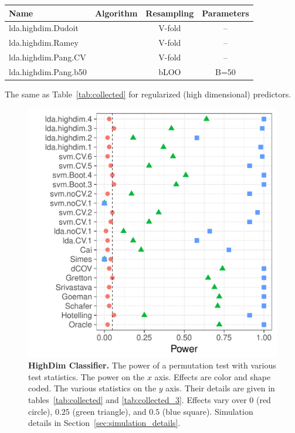 \documentclass[journal]{IEEEtran}
\begin{document}
\begin{tcolorbox}
	\centering
	\tiny
	\begin{tabular}{l|c|c|c}
		Name & Algorithm & Resampling &  Parameters\\ 
		\hline
		\hline
		lda.highdim.Dudoit & \cite{dudoit_comparison_2002} & V-fold & -- \\ 
		lda.highdim.Ramey & \cite{ramey_high-dimensional_2016} & V-fold & -- \\ 
		lda.highdim.Pang.CV & \cite{pang_shrinkage-based_2009} & V-fold & -- \\ 
		lda.highdim.Pang.b50 & \cite{pang_shrinkage-based_2009} & bLOO 	 & B=50 \\ 
	\end{tabular} 
	\captionsetup{type=table}
	\caption{\footnotesize
		The same as Table~\ref{tab:collected} for regularized (high dimensional) predictors. 
	} 
	\label{tab:collected_3}
\end{tcolorbox}


\begin{figure}[ht]
	\centering
	\includegraphics[width=0.7\columnwidth]{"art/file14"}
	\caption{
		\textbf{HighDim Classifier.} 
		The power of a permutation test with various test statistics. 
		The power on the $x$ axis. 
		Effects are color and shape coded. 
		The various statistics on the $y$ axis. 
		Their details are given in tables~\ref{tab:collected} and \ref{tab:collected_3}. 
		Effects vary over $0$ (red circle), $0.25$ (green triangle), and $0.5$ (blue square). 
		Simulation details in Section~\ref{sec:simulation_details}.
	} 
	\label{fig:highdim}
\end{figure}
\end{document}
